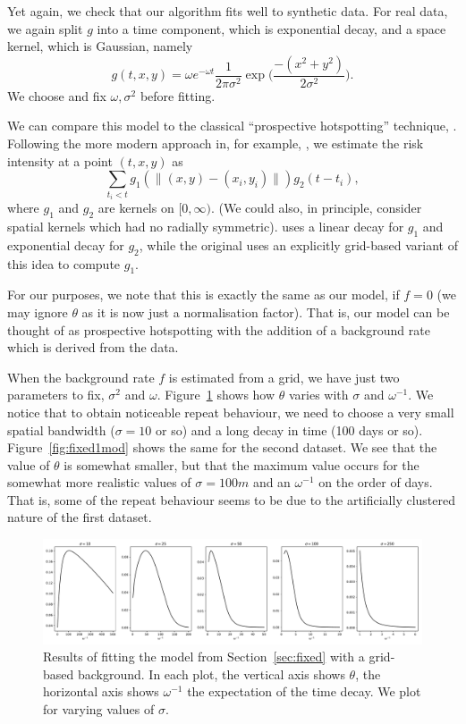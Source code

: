 \documentclass[twoside,a4paper]{article}
\theoremstyle{plain}
\theoremstyle{definition}
\begin{document}
Yet again, we check that our algorithm fits well to synthetic data.  For real data, we again
split $g$ into a time component, which is exponential decay, and a space kernel, which is
Gaussian, namely
\[ g(t,x,y) = \omega e^{-\omega t} \frac{1}{2\pi\sigma^2}
\exp\Big( \frac{-(x^2+y^2)}{2\sigma^2} \Big). \]
We choose and fix $\omega, \sigma^2$ before fitting.

We can compare this model to the classical ``prospective hotspotting'' technique,
\cite{bjp}.  Following the more modern approach in, for example, \cite{rdbjc},
we estimate the risk intensity at a point $(t,x,y)$ as
\[ \sum_{t_i<t} g_1(\|(x,y) - (x_i,y_i)\|) g_2(t-t_i), \]
where $g_1$ and $g_2$ are kernels on $[0,\infty)$.  (We could also, in principle, consider
spatial kernels which had no radially symmetric).  \cite{rdbjc} uses a linear decay
for $g_1$ and exponential decay for $g_2$, while the original \cite{bjp} uses an explicitly
grid-based variant of this idea to compute $g_1$.

For our purposes, we note that this is exactly the same as our model, if $f=0$ (we may ignore
$\theta$ as it is now just a normalisation factor).  That is, our model can be thought of
as prospective hotspotting with the addition of a background rate which is derived from the data.

When the background rate $f$ is estimated from a grid, we have just two parameters to fix,
$\sigma^2$ and $\omega$.  Figure~\ref{fig:fixed1} shows how $\theta$ varies with $\sigma$
and $\omega^{-1}$.  We notice that to obtain noticeable repeat behaviour, we need to choose
a very small spatial bandwidth ($\sigma=10$ or so) and a long decay in time (100 days or so).
Figure~\ref{fig:fixed1mod} shows the same for the second dataset.  We see that the value of
$\theta$ is somewhat smaller, but that the maximum value occurs for the somewhat more
realistic values of $\sigma=100m$ and an $\omega^{-1}$ on the order of days.  That is,
some of the repeat behaviour seems to be due to the artificially clustered nature of
the first dataset.

\begin{figure}
  \includegraphics[width=\textwidth]{../notebooks/fixed_grid_1.pdf}
  \caption{Results of fitting the model from Section~\ref{sec:fixed} with a grid-based
  background.  In each plot, the vertical axis shows $\theta$, the horizontal axis shows
  $\omega^{-1}$ the expectation of the time decay.  We plot for varying values of $\sigma$.}
  \label{fig:fixed1}
\end{figure}
\end{document}
